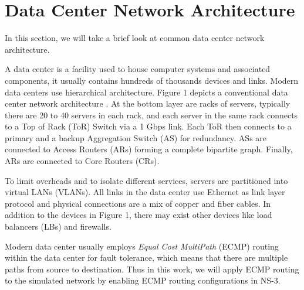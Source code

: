 \documentclass{sig-alternate-05-2015}
\begin{document}
\section{Data Center Network Architecture}
In this section, we will take a brief look at common data center network architecture.

A data center is a facility used to house computer systems and associated components, it usually contains hundreds of thousands devices and links. Modern data centers use hierarchical architecture. Figure 1 depicts a conventional data center network architecture \cite{gill2011understanding, greenberg2009vl2, herodotou2014scalable}. At the bottom layer are racks of servers, typically there are 20 to 40 servers in each rack, and each server in the same rack connects to a Top of Rack (ToR) Switch via a 1 Gbps link. Each ToR then connects to a primary and a backup Aggregation Switch (AS) for redundancy. ASs are connected to Access Routers (ARs) forming a complete bipartite graph. Finally, ARs are connected to Core Routers (CRs).

To limit overheads and to isolate different services, servers are partitioned into virtual LANs (VLANs). All links in the data center use Ethernet as link layer protocol and physical connections are a mix of copper and fiber cables. In addition to the devices in Figure 1, there may exist other devices like load balancers (LBs) and firewalls.

Modern data center usually employs \textit{Equal Cost MultiPath} (ECMP) routing within the data center for fault tolerance, which means that there are multiple paths from source to destination. Thus in this work, we will apply ECMP routing to the simulated network by enabling ECMP routing configurations in NS-3.
\end{document}
